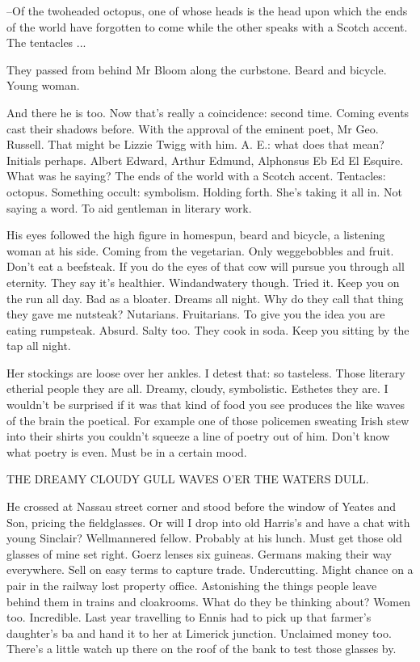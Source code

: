 --Of the twoheaded octopus,
one of whose heads is the head upon which
the ends of the world have forgotten to come while the other speaks with a
Scotch accent.
The tentacles ...

They passed from behind Mr Bloom along the curbstone.
Beard and
bicycle.
Young woman.

And there he is too.
Now that's really a coincidence:
second time.
Coming events cast their shadows before.
With the approval of the eminent
poet,
Mr Geo.
Russell.
That might be Lizzie Twigg with him.
A.
E.:
what
does that mean?
Initials perhaps.
Albert Edward,
Arthur Edmund,
Alphonsus Eb Ed El Esquire.
What was he saying?
The ends of the world
with a Scotch accent.
Tentacles:
octopus.
Something occult:
symbolism.
Holding forth.
She's taking it all in.
Not saying a word.
To aid gentleman
in literary work.

His eyes followed the high figure in homespun,
beard and bicycle,
a
listening woman at his side.
Coming from the vegetarian.
Only
weggebobbles and fruit.
Don't eat a beefsteak.
If you do the eyes of that
cow will pursue you through all eternity.
They say it's healthier.
Windandwatery though.
Tried it.
Keep you on the run all day.
Bad as a
bloater.
Dreams all night.
Why do they call that thing they gave me
nutsteak?
Nutarians.
Fruitarians.
To give you the idea you are eating
rumpsteak.
Absurd.
Salty too.
They cook in soda.
Keep you sitting by the
tap all night.

Her stockings are loose over her ankles.
I detest that:
so tasteless.
Those literary etherial people they are all.
Dreamy,
cloudy,
symbolistic.
Esthetes they are.
I wouldn't be surprised if it was that kind of food you
see produces the like waves of the brain the poetical.
For example one of
those policemen sweating Irish stew into their shirts you couldn't squeeze
a line of poetry out of him.
Don't know what poetry is even.
Must be in a
certain mood.


    THE DREAMY CLOUDY GULL
    WAVES O'ER THE WATERS DULL.


He crossed at Nassau street corner and stood before the window of
Yeates and Son,
pricing the fieldglasses.
Or will I drop into old Harris's
and have a chat with young Sinclair?
Wellmannered fellow.
Probably at his
lunch.
Must get those old glasses of mine set right.
Goerz lenses six
guineas.
Germans making their way everywhere.
Sell on easy terms to
capture trade.
Undercutting.
Might chance on a pair in the railway lost
property office.
Astonishing the things people leave behind them in trains
and cloakrooms.
What do they be thinking about?
Women too.
Incredible.
Last year travelling to Ennis had to pick up that farmer's daughter's ba
 and hand it to her at Limerick junction.
Unclaimed money too.
There's a
little watch up there on the roof of the bank to test those glasses by.

